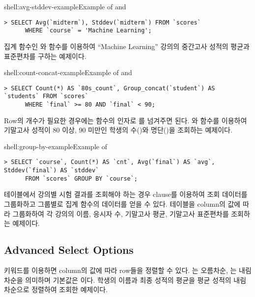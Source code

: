 \begin{shell}{shell:avg-stddev-example}{Example of  and }
\begin{verbatim}
> SELECT Avg(`midterm`), Stddev(`midterm`) FROM `scores`
      WHERE `course` = 'Machine Learning';
\end{verbatim}
\end{shell}

\은 집계 함수인 와  함수를 이용하여 ``Machine Learning'' 강의의 중간고사 성적의 평균과 표준편차를 구하는 예제이다.

\begin{shell}{shell:count-concat-example}{Example of  and }
\begin{verbatim}
> SELECT Count(*) AS `80s_count`, Group_concat(`student`) AS `students` FROM `scores`
      WHERE `final` >= 80 AND `final` < 90;
\end{verbatim}
\end{shell}

Row의 개수가 필요한 경우에는  함수의 인자로 \cd{*}를 넘겨주면 된다. \은 와  함수를 이용하여 기말고사 성적이 80 이상, 90 미만인 학생의 수()와 명단()을 조회하는 예제이다.
\clearpage

\begin{shell}{shell:group-by-example}{Example of }
\begin{verbatim}
> SELECT `course`, Count(*) AS `cnt`, Avg(`final`) AS `avg`, Stddev(`final`) AS `stddev`
      FROM `scores` GROUP BY `course`;
\end{verbatim}
\end{shell}

 테이블에서 강의별 시험 결과를 조회해야 하는 경우  clause를 이용하여 조회 데이터를 그룹화하고 그룹별로 집계 함수의 데이터를 얻을 수 있다. \은  테이블을  column의 값에 따라 그룹화하여 각 강의의 이름, 응시자 수, 기말고사 평균, 기말고사 표준편차를 조회하는 예제이다.

\subsection*{Advanced Select Options}

 키워드를 이용하면 column의 값에 따라 row들을 정렬할 수 있다. 는 오름차순, 는 내림차순을 의미하며 기본값은 이다. \은 학생의 이름과 최종 성적의 평균을 평균 성적의 내림차순으로 정렬하여 조회한 예제이다.

